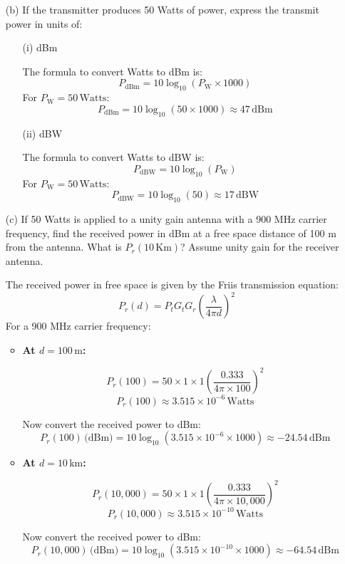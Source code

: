 \documentclass[12pt]{article}
\begin{document}
\begin{flushleft}
\begin{enumerate}
			\item[(b)] If the transmitter produces 50 Watts of power, express the transmit power in units of:
			
			\begin{enumerate}
				\item[(i)] dBm
				
				The formula to convert Watts to dBm is:
				\[
				P_{\text{dBm}} = 10 \log_{10}(P_{\text{W}} \times 1000)
				\]
				For \(P_{\text{W}} = 50 \, \text{Watts}\):
				\[
				P_{\text{dBm}} = 10 \log_{10}(50 \times 1000) \approx 47 \, \text{dBm}
				\]
				
				\item[(ii)] dBW
				
				The formula to convert Watts to dBW is:
				\[
				P_{\text{dBW}} = 10 \log_{10}(P_{\text{W}})
				\]
				For \(P_{\text{W}} = 50 \, \text{Watts}\):
				\[
				P_{\text{dBW}} = 10 \log_{10}(50) \approx 17 \, \text{dBW}
				\]
			\end{enumerate}
			
			\item[(c)] If 50 Watts is applied to a unity gain antenna with a 900 MHz carrier frequency, find the received power in dBm at a free space distance of 100 m from the antenna. What is \(P_r(10 \, \text{Km})\)? Assume unity gain for the receiver antenna.
			
			The received power in free space is given by the Friis transmission equation:
			\[
			P_r(d) = P_t G_t G_r \left(\frac{\lambda}{4\pi d}\right)^2
			\]
			For a 900 MHz carrier frequency:
			\begin{itemize}
				\item \textbf{At \(d = 100 \, \text{m}\):}
				
				\[
				P_r(100) = 50 \times 1 \times 1 \left(\frac{0.333}{4\pi \times 100}\right)^2
				\]
				\[
				P_r(100) \approx 3.515 \times 10^{-6} \, \text{Watts}
				\]
				
				Now convert the received power to dBm:
				\[
				P_r(100) \, \text{(dBm)} = 10 \log_{10}(3.515 \times 10^{-6} \times 1000) \approx -24.54 \, \text{dBm}
				\]
				
				\item \textbf{At \(d = 10 \, \text{km}\):}
				
				\[
				P_r(10,000) = 50 \times 1 \times 1 \left(\frac{0.333}{4\pi \times 10,000}\right)^2
				\]
				\[
				P_r(10,000) \approx 3.515 \times 10^{-10} \, \text{Watts}
				\]
				
				Now convert the received power to dBm:
				\[
				P_r(10,000) \, \text{(dBm)} = 10 \log_{10}(3.515 \times 10^{-10} \times 1000) \approx -64.54 \, \text{dBm}
				\]
			\end{itemize}
			

\end{enumerate}
\end{flushleft}
\end{document}
